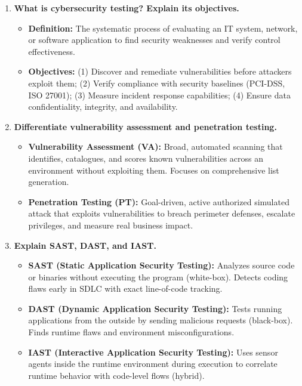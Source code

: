 \begin{enumerate}[label=\textbf{Q\arabic*.,resume},leftmargin=1.2cm]
\item \textbf{What is cybersecurity testing? Explain its objectives.}
\begin{itemize}
\item \textbf{Definition:} The systematic process of evaluating an IT system, network, or software application to find security weaknesses and verify control effectiveness.
\item \textbf{Objectives:} (1) Discover and remediate vulnerabilities before attackers exploit them; (2) Verify compliance with security baselines (PCI-DSS, ISO 27001); (3) Measure incident response capabilities; (4) Ensure data confidentiality, integrity, and availability.
\end{itemize}

\item \textbf{Differentiate vulnerability assessment and penetration testing.}
\begin{itemize}
\item \textbf{Vulnerability Assessment (VA):} Broad, automated scanning that identifies, catalogues, and scores known vulnerabilities across an environment without exploiting them. Focuses on comprehensive list generation.
\item \textbf{Penetration Testing (PT):} Goal-driven, active authorized simulated attack that exploits vulnerabilities to breach perimeter defenses, escalate privileges, and measure real business impact.
\end{itemize}

\item \textbf{Explain SAST, DAST, and IAST.}
\begin{itemize}
\item \textbf{SAST (Static Application Security Testing):} Analyzes source code or binaries without executing the program (white-box). Detects coding flaws early in SDLC with exact line-of-code tracking.
\item \textbf{DAST (Dynamic Application Security Testing):} Tests running applications from the outside by sending malicious requests (black-box). Finds runtime flaws and environment misconfigurations.
\item \textbf{IAST (Interactive Application Security Testing):} Uses sensor agents inside the runtime environment during execution to correlate runtime behavior with code-level flows (hybrid).
\end{itemize}


\end{enumerate}
